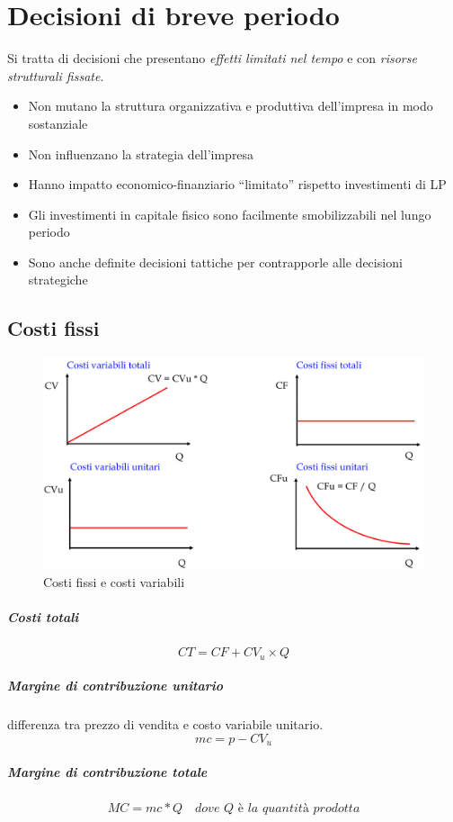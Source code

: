 \chapter{Decisioni di breve periodo}
Si tratta di decisioni che presentano \emph{effetti limitati nel tempo} e con \emph{risorse strutturali
fissate}.

\begin{itemize}
	\item Non mutano la struttura organizzativa e produttiva dell’impresa in
	modo sostanziale
	\item Non influenzano la strategia dell’impresa
	\item Hanno impatto economico-finanziario “limitato” rispetto investimenti di LP
	\item Gli investimenti in capitale fisico sono facilmente smobilizzabili nel lungo
	periodo
	\item Sono anche definite decisioni tattiche per contrapporle alle decisioni
	strategiche
\end{itemize}

\section{Costi fissi}

\begin{figure}[h]
	\centering
	\includegraphics[width=0.5\linewidth]{images/costi}
	\caption{Costi fissi e costi variabili}
	\label{fig:costi}
\end{figure}

\paragraph{Costi totali}
\[
CT = CF + CV_u \times Q
\]
\paragraph{Margine di contribuzione unitario}
differenza tra prezzo di vendita e costo
variabile unitario.
\[
mc = p - CV_u
\]

\paragraph{Margine di contribuzione totale}
\[
MC = mc * Q \quad \textit{dove $Q$ \`e la quantit\`a prodotta}
\]
